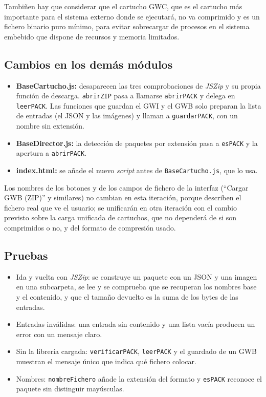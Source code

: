 Tambiñen hay que considerar que el cartucho GWC, que es el cartucho más importante para el sistema externo donde se ejecutará, no va comprimido y es un fichero binario puro mínimo, para evitar sobrecargar de procesos en el sistema embebido que dispone de recursos y memoria limitados.

\subsection{Cambios en los demás módulos}
\label{sec:F5I11Cambios}

\begin{itemize}
	\item \textbf{BaseCartucho.js:} desaparecen las tres comprobaciones de \emph{JSZip} y su propia función de descarga. \texttt{abrirZIP} pasa a llamarse \texttt{abrirPACK} y delega en \texttt{leerPACK}. Las funciones que guardan el GWI y el GWB solo preparan la lista de entradas (el JSON y las imágenes) y llaman a \texttt{guardarPACK}, con un nombre sin extensión.
	\item \textbf{BaseDirector.js:} la detección de paquetes por extensión pasa a \texttt{esPACK} y la apertura a \texttt{abrirPACK}.
	\item \textbf{index.html:} se añade el nuevo \emph{script} antes de \texttt{BaseCartucho.js}, que lo usa.
\end{itemize}

Los nombres de los botones y de los campos de fichero de la interfaz (``Cargar GWB (ZIP)'' y similares) no cambian en esta iteración, porque describen el fichero real que ve el usuario; se unificarán en otra iteración con el cambio previsto sobre la carga unificada de cartuchos, que no dependerá de si son comprimidos o no, y del formato de compresión usado.

\subsection{Pruebas}
\label{sec:F5I11Pruebas}

\begin{itemize}
	\item Ida y vuelta con \emph{JSZip}: se construye un paquete con un JSON y una imagen en una subcarpeta, se lee y se comprueba que se recuperan los nombres base y el contenido, y que el tamaño devuelto es la suma de los bytes de las entradas.
	\item Entradas inválidas: una entrada sin contenido y una lista vacía producen un error con un mensaje claro.
	\item Sin la librería cargada: \texttt{verificarPACK}, \texttt{leerPACK} y el guardado de un GWB muestran el mensaje único que indica qué fichero colocar.
	\item Nombres: \texttt{nombreFichero} añade la extensión del formato y \texttt{esPACK} reconoce el paquete sin distinguir mayúsculas.
\end{itemize}

